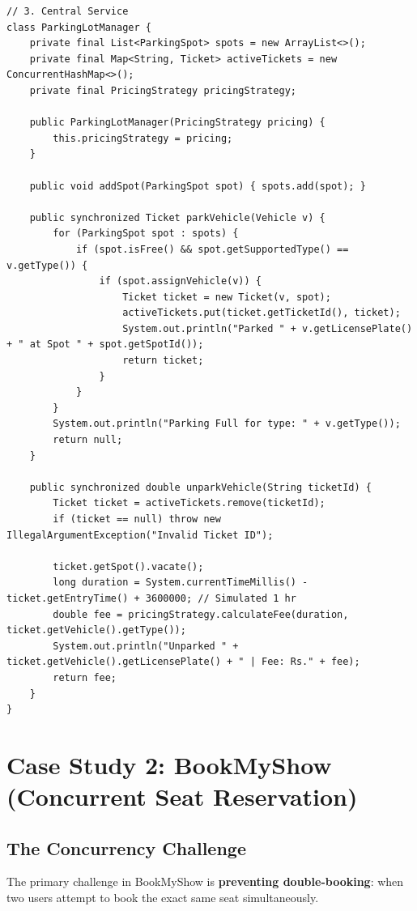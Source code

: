 \documentclass[10pt,journal,compsoc,onecolumn]{IEEEtran}
\begin{document}
\begin{verbatim}
// 3. Central Service
class ParkingLotManager {
    private final List<ParkingSpot> spots = new ArrayList<>();
    private final Map<String, Ticket> activeTickets = new ConcurrentHashMap<>();
    private final PricingStrategy pricingStrategy;

    public ParkingLotManager(PricingStrategy pricing) {
        this.pricingStrategy = pricing;
    }

    public void addSpot(ParkingSpot spot) { spots.add(spot); }

    public synchronized Ticket parkVehicle(Vehicle v) {
        for (ParkingSpot spot : spots) {
            if (spot.isFree() && spot.getSupportedType() == v.getType()) {
                if (spot.assignVehicle(v)) {
                    Ticket ticket = new Ticket(v, spot);
                    activeTickets.put(ticket.getTicketId(), ticket);
                    System.out.println("Parked " + v.getLicensePlate() + " at Spot " + spot.getSpotId());
                    return ticket;
                }
            }
        }
        System.out.println("Parking Full for type: " + v.getType());
        return null;
    }

    public synchronized double unparkVehicle(String ticketId) {
        Ticket ticket = activeTickets.remove(ticketId);
        if (ticket == null) throw new IllegalArgumentException("Invalid Ticket ID");

        ticket.getSpot().vacate();
        long duration = System.currentTimeMillis() - ticket.getEntryTime() + 3600000; // Simulated 1 hr
        double fee = pricingStrategy.calculateFee(duration, ticket.getVehicle().getType());
        System.out.println("Unparked " + ticket.getVehicle().getLicensePlate() + " | Fee: Rs." + fee);
        return fee;
    }
}
\end{verbatim}

\section{Case Study 2: BookMyShow (Concurrent Seat Reservation)}
\label{sec:bookmyshow}

\subsection{The Concurrency Challenge}
The primary challenge in BookMyShow is \textbf{preventing double-booking}: when two users attempt to book the exact same seat simultaneously. 
\end{document}
